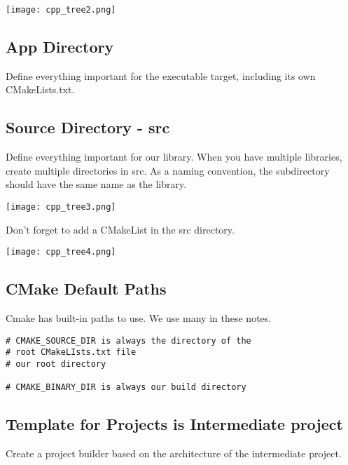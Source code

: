 \documentclass[openany]{report}
\begin{document}
\begin{center}
    \texttt{[image: cpp\_tree2.png]}
\end{center}

\subsection{App Directory}

Define everything important for the executable target, including its own CMakeLists.txt.

\subsection{Source Directory - src}

Define everything important for our library. When you have multiple libraries, create multiple directories in
src. As a naming convention, the subdirectory should have the same name as the library.

\begin{center}
    \texttt{[image: cpp\_tree3.png]}
\end{center}

Don't forget to add a CMakeList in the src directory.


\begin{center}
    \texttt{[image: cpp\_tree4.png]}
\end{center}

\subsection{CMake Default Paths}

Cmake has built-in paths to use. We use many in these notes.

\begin{verbatim}
# CMAKE_SOURCE_DIR is always the directory of the
# root CMakeLIsts.txt file
# our root directory

# CMAKE_BINARY_DIR is always our build directory
\end{verbatim}



\subsection{Template for Projects is Intermediate project}

Create a project builder based on the architecture of the intermediate project.
\end{document}

